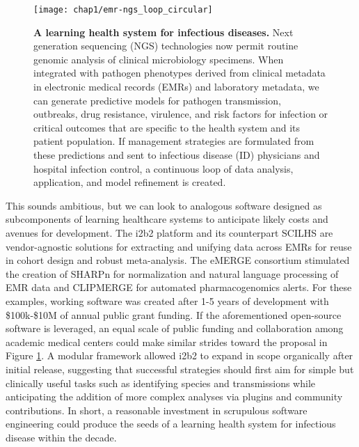 \begin{figure}[htb]
  \texttt{[image: chap1/emr-ngs\_loop\_circular]}               
  \caption[A learning health system for infectious diseases]{\textbf{A learning health system for infectious diseases.} Next generation sequencing (NGS) technologies now permit routine genomic analysis of clinical microbiology specimens. When integrated with pathogen phenotypes derived from clinical metadata in electronic medical records (EMRs) and laboratory metadata, we can generate predictive models for pathogen transmission, outbreaks, drug resistance, virulence, and risk factors for infection or critical outcomes that are specific to the health system and its patient population. If management strategies are formulated from these predictions and sent to infectious disease (ID) physicians and hospital infection control, a continuous loop of data analysis, application, and model refinement is created.}
  \label{fig:emr_ngs_loop}
\end{figure}

This sounds ambitious, but we can look to analogous software designed as subcomponents of learning healthcare systems to anticipate likely costs and avenues for development. The i2b2 platform\autocite{Kohane2012} and its counterpart SCILHS\autocite{Mandl2014} are vendor-agnostic solutions for extracting and unifying data across EMRs for reuse in cohort design and robust meta-analysis. The eMERGE consortium stimulated the creation of SHARPn for normalization and natural language processing of EMR data\autocite{Rea2012} and CLIPMERGE for automated pharmacogenomics alerts.\autocite{Gottesman2013} For these examples, working software was created after 1-5 years of development with \$100k-\$10M of annual public grant funding.\autocite{Gottesman2013,Kohane2012,Mandl2014,Rea2012} If the aforementioned open-source software is leveraged, an equal scale of public funding and collaboration among academic medical centers could make similar strides toward the proposal in Figure \ref{fig:emr_ngs_loop}. A modular framework allowed i2b2 to expand in scope organically after initial release,\autocite{Kohane2012,Mandl2014} suggesting that successful strategies should first aim for simple but clinically useful tasks such as identifying species and transmissions while anticipating the addition of more complex analyses via plugins and community contributions. In short, a reasonable investment in scrupulous software engineering could produce the seeds of a learning health system for infectious disease within the decade.

